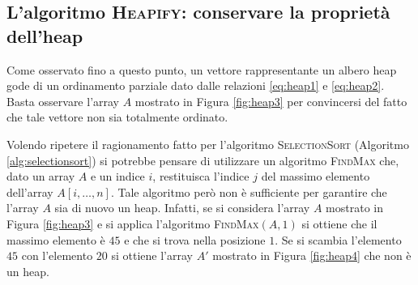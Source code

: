 \begin{center}
\label{fig:heap3}
\end{center}

\subsection{L'algoritmo \textsc{Heapify}: conservare la proprietà dell'heap}
Come osservato fino a questo punto, un vettore rappresentante un albero heap gode di un ordinamento parziale dato dalle relazioni \ref{eq:heap1} e \ref{eq:heap2}. Basta osservare l'array $A$ mostrato in Figura \ref{fig:heap3} per convincersi del fatto che tale vettore non sia totalmente ordinato.

Volendo ripetere il ragionamento fatto per l'algoritmo \textsc{SelectionSort} (Algoritmo \ref{alg:selectionsort}) si potrebbe pensare di utilizzare un algoritmo \textsc{FindMax} che, dato un array $A$ e un indice $i$, restituisca l'indice $j$ del massimo elemento dell'array $A[i,\ldots,n]$. Tale algoritmo però non è sufficiente per garantire che l'array $A$ sia di nuovo un heap. Infatti, se si considera l'array $A$ mostrato in Figura \ref{fig:heap3} e si applica l'algoritmo \textsc{FindMax}$(A,1)$ si ottiene che il massimo elemento è $45$ e che si trova nella posizione $1$. Se si scambia l'elemento $45$ con l'elemento $20$ si ottiene l'array $A'$ mostrato in Figura \ref{fig:heap4} che non è un heap.

